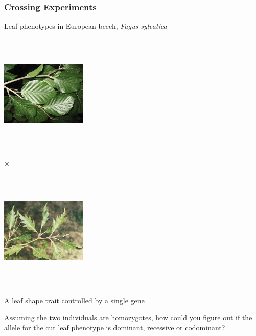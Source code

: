 \documentclass{beamer}
\begin{document}
\begin{frame}
	\frametitle{Crossing Experiments}
	Leaf phenotypes in European beech, \textit{Fagus sylvatica}
	\begin{center}
	\newcommand{\picA}{\includegraphics[keepaspectratio, height=2.25in,width=1.6in]{img/roundBeechLeaf}}
	\newcommand{\picB}{\includegraphics[keepaspectratio, height=2.25in,width=1.6in]{img/cutBeechLeaf}}
	\Huge
	\parbox{\widthof{\picA}}{\picA} $\times$ 
	\parbox{\widthof{\picB}}{\picB} 
\end{center}	
	\normalsize
	A leaf shape trait controlled by a single gene 
	\bigskip
	
	Assuming the two individuals are homozygotes, how could you figure out if the allele for the cut leaf phenotype is dominant, recessive or codominant?
	
\end{frame}
\end{document}
